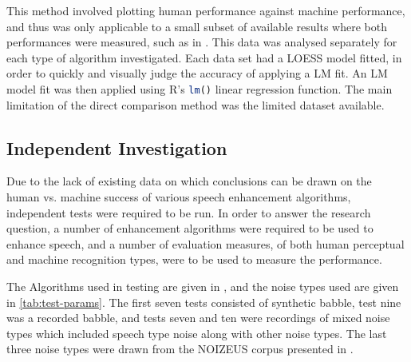 This method involved plotting human performance against machine performance,
and thus was only applicable to a small subset of available results
where both performances were measured, such as in \citep{Paliwal2010}.
This data was analysed separately for each type of algorithm investigated.
Each data set had a \ac{LOESS} model fitted, in order to quickly
and visually judge the accuracy of applying a \ac{LM} fit. An \ac{LM}
model fit was then applied using R's \lstinline[language=R]!lm()!
linear regression function. The main limitation of the direct comparison
method was the limited dataset available.


\subsection{\label{sub:Independent-Investigation-Meth}Independent Investigation}

Due to the lack of existing data on which conclusions can be drawn
on the human vs. machine success of various speech enhancement algorithms,
independent tests were required to be run. In order to answer the
research question, a number of enhancement algorithms were required
to be used to enhance speech, and a number of evaluation measures,
of both human perceptual and machine recognition types, were to be
used to measure the performance.

The Algorithms used in testing are given in ,
and the noise types used are given in \ref{tab:test-params}. The
first seven tests consisted of synthetic babble, test nine was a recorded
babble, and tests seven and ten were recordings of mixed noise types
which included speech type noise along with other noise types. The
last three noise types were drawn from the NOIZEUS corpus presented
in \citep{Hu2006}.

